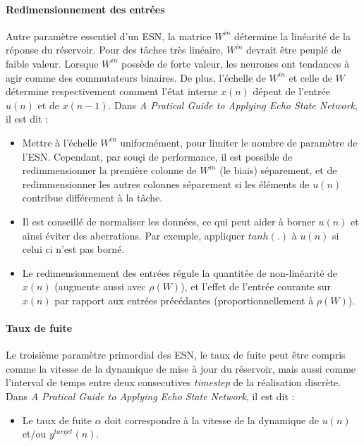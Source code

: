 \documentclass[12pt]{article}
\begin{document}
\paragraph{Redimensionnement des entrées}
Autre paramètre essentiel d'un ESN, la matrice $W^{in}$ détermine la linéarité de la réponse du réservoir. Pour des tâches très linéaire, $W^{in}$ devrait être peuplé de faible valeur. Lorsque $W^{in}$ possède de forte valeur, les neurones ont tendances à agir comme des commutateurs binaires. De plus, l'échelle de $W^{in}$ et celle de $W$ détermine respectivement comment l'état interne $x(n)$ dépent de l'entrée $u(n)$ et de $x(n-1)$.\newline
Dans \textit{A Pratical Guide to Applying Echo State Network}, il est dit :
\begin{itemize}
\item Mettre à l'échelle $W^{in}$ uniformément, pour limiter le nombre de paramètre de l'ESN. Cependant, par souçi de performance, il est possible de redimmensionner la première colonne de $W^{in}$ (le biais) séparement, et de redimmensionner les autres colonnes séparement si les éléments de $u(n)$ contribue différement à la tâche.
\item Il est conseillé de normaliser les données, ce qui peut aider à borner $u(n)$ et ainsi éviter des aberrations. Par exemple, appliquer $tanh(.)$ à $u(n)$ si celui ci n'est pas borné.
\item Le redimensionnement des entrées régule la quantitée de non-linéarité de $x(n)$ (augmente aussi avec $\rho(W)$), et l'effet de l'entrée courante sur $x(n)$ par rapport aux entrées précédantes (proportionnellement à $\rho(W)$).
\end{itemize}

\paragraph{Taux de fuite}
Le troisième paramètre primordial des ESN, le taux de fuite peut être compris comme la vitesse de la dynamique de mise à jour du réservoir, mais aussi comme l'interval de temps entre deux consecutives \textit{timestep} de la réalisation discrète.\newline
Dans \textit{A Pratical Guide to Applying Echo State Network}, il est dit :
\begin{itemize}
\item Le taux de fuite $\alpha$ doit correspondre à la vitesse de la dynamique de $u(n)$ et/ou $y^{target}(n)$.
\end{itemize}
\end{document}
